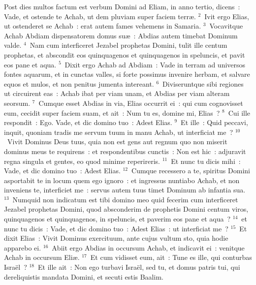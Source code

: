 \lettrine[lines=10,image=true,loversize=0.05,lraise=-0.03]{P}{}ost dies multos factum est verbum Domini ad Eliam, in anno tertio, dicens~: Vade, et ostende te Achab, ut dem pluviam super faciem terr\ae .
${}^{2}$~Ivit ergo Elias, ut ostenderet se Achab~: erat autem fames vehemens in Samaria.
${}^{3}$~Vocavitque Achab Abdiam dispensatorem domus su\ae~: Abdias autem timebat Dominum valde.
${}^{4}$~Nam cum interficeret Jezabel prophetas Domini, tulit ille centum prophetas, et abscondit eos quinquagenos et quinquagenos in speluncis, et pavit eos pane et aqua.
${}^{5}$~Dixit ergo Achab ad Abdiam~: Vade in terram ad universos fontes aquarum, et in cunctas valles, si forte possimus invenire herbam, et salvare equos et mulos, et non penitus jumenta intereant.
${}^{6}$~Diviseruntque sibi regiones ut circuirent eas~: Achab ibat per viam unam, et Abdias per viam alteram seorsum.
${}^{7}$~Cumque esset Abdias in via, Elias occurrit ei~: qui cum cognovisset eum, cecidit super faciem suam, et ait~: Num tu es, domine mi, Elias~?
${}^{8}$~Cui ille respondit~: Ego. Vade, et dic domino tuo~: Adest Elias.
${}^{9}$~Et ille~: Quid peccavi, inquit, quoniam tradis me servum tuum in manu Achab, ut interficiat me~?
${}^{10}$~Vivit Dominus Deus tuus, quia non est gens aut regnum quo non miserit dominus meus te requirens~: et respondentibus cunctis~: Non est hic~: adjuravit regna singula et gentes, eo quod minime reperireris.
${}^{11}$~Et nunc tu dicis mihi~: Vade, et dic domino tuo~: Adest Elias.
${}^{12}$~Cumque recessero a te, spiritus Domini asportabit te in locum quem ego ignoro~: et ingressus nuntiabo Achab, et non inveniens te, interficiet me~: servus autem tuus timet Dominum ab infantia sua.
${}^{13}$~Numquid non indicatum est tibi domino meo quid fecerim cum interficeret Jezabel prophetas Domini, quod absconderim de prophetis Domini centum viros, quinquagenos et quinquagenos, in speluncis, et paverim eos pane et aqua~?
${}^{14}$~et nunc tu dicis~: Vade, et dic domino tuo~: Adest Elias~: ut interficiat me~?
${}^{15}$~Et dixit Elias~: Vivit Dominus exercituum, ante cujus vultum sto, quia hodie apparebo ei.
${}^{16}$~Abiit ergo Abdias in occursum Achab, et indicavit ei~: venitque Achab in occursum Eli\ae .
${}^{17}$~Et cum vidisset eum, ait~: Tune es ille, qui conturbas Isra\"el~?
${}^{18}$~Et ille ait~: Non ego turbavi Isra\"el, sed tu, et domus patris tui, qui dereliquistis mandata Domini, et secuti estis Baalim.


